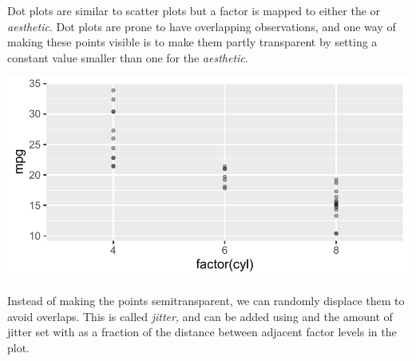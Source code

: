 \documentclass[krantz2]{krantz}\usepackage{knitr}
\begin{document}
Dot plots are similar to scatter plots but a factor is mapped to either the  or  \emph{aesthetic}. Dot plots are prone to have overlapping observations, and one way of making these points visible is to make them partly transparent by setting a constant value smaller than one for the  \emph{aesthetic}.

\begin{knitrout}\footnotesize
{}\color{fgcolor}\begin{kframe}
\begin{alltt}
\hlstd{(}  \hlstd{(} \hlstd{=}    \hlopt{+}
  \hlstd{(} \hlstd{=} \hlopt{/}\hlstd{)}
\end{alltt}
\end{kframe}

{\centering \includegraphics[width=.7\textwidth]{figure/pos-scatter-12a-1} 

}



\end{knitrout}

Instead of making the points semitransparent, we can randomly displace them to avoid overlaps. This is called \emph{jitter}, and can be added using  and the amount of jitter set with  as a fraction of the distance between adjacent factor levels in the plot.

\begin{knitrout}\footnotesize
{}\color{fgcolor}\begin{kframe}
\begin{alltt}
\hlstd{(}  \hlstd{(} \hlstd{=}    \hlopt{+}
  \hlstd{(} \hlstd{=} \hlstd{(} \hlstd{=} \hlstd{))}
\end{alltt}
\end{kframe}
\end{knitrout}
\end{document}
